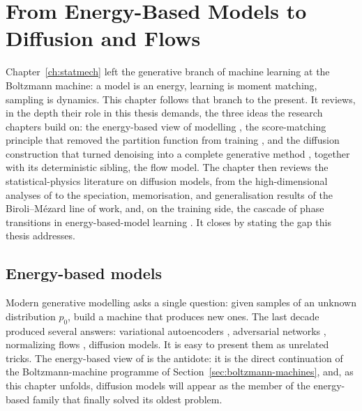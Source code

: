 \chapter{From Energy-Based Models to Diffusion and Flows}
\label{ch:diffusion}\label{ch:ebm}

Chapter~\ref{ch:statmech} left the generative branch of machine learning
at the Boltzmann machine: a model is an energy, learning is moment
matching, sampling is dynamics. This chapter follows that branch to the
present. It reviews, in the depth their role in this thesis demands, the
three ideas the research chapters build on: the energy-based view of
modelling \citep{lecun2006tutorial}, the score-matching principle that
removed the partition function from training
\citep{hyvarinen2005estimation, vincent2011connection}, and the diffusion
construction that turned denoising into a complete generative method
\citep{sohl2015deep, ho2020denoising, song2021scorebased}, together with
its deterministic sibling, the flow model. The chapter then reviews the
statistical-physics literature on diffusion models, from the
high-dimensional analyses of \citet{biroli2023generative} to the
speciation, memorisation, and generalisation results of the
Biroli--M\'ezard line of work, and, on the training side, the cascade of
phase transitions in energy-based-model learning
\citep{bachtis2024cascade}. It closes by stating the gap this thesis
addresses.

\section{Energy-based models}\label{sec:ebm-def}

Modern generative modelling asks a single question: given samples of an
unknown distribution $p_0$, build a machine that produces new ones. The
last decade produced several answers: variational autoencoders
\citep{kingma2014auto}, adversarial networks
\citep{goodfellow2014generative}, normalizing flows
\citep{rezende2015variational}, diffusion models. It is easy to present
them as unrelated tricks. The energy-based view of
\citet{lecun2006tutorial} is the antidote: it is the direct continuation
of the Boltzmann-machine programme of
Section~\ref{sec:boltzmann-machines}, and, as this chapter unfolds,
diffusion models will appear as the member of the energy-based family
that finally solved its oldest problem.

